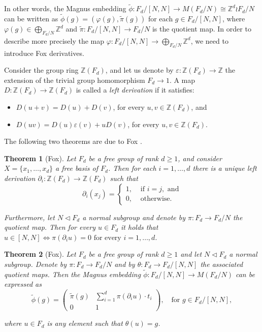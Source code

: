 \documentclass[reqno,oneside,11pt]{amsart}
\newcommand{\Z}{\mathbb{Z}}
\theoremstyle{plain}
\newtheorem{thm}{Theorem}[section] %
\theoremstyle{definition}
\begin{document}
In other words, the Magnus embedding $\widetilde{\phi}:F_d/[N,N]\to M(F_d/N)\cong \Z^d\wr F_d/N$ can be written as $\widetilde{\phi}(g)=(\varphi(g),\widetilde{\pi}(g))$ for each $g\in F_d/[N,N]$, where $\varphi(g)\in \bigoplus_{F_d/N}\Z^d$ and $\widetilde{\pi}:F_d/[N,N]\to F_d/N$ is the quotient map. In order to describe more precisely the map $\varphi:F_d/[N,N]\to \bigoplus_{F_d/N}\Z^d$, we need to introduce Fox derivatives.

Consider the group ring $\Z(F_d)$, and let us denote by $\varepsilon:\Z(F_d)\to \Z$ the extension of the trivial group homomorphism $F_d\to 1$. A map $D:\Z(F_d)\to \Z(F_d)$ is called a \emph{left derivation} if it satisfies:
\begin{itemize}
	\item $D(u+v)=D(u)+D(v)$, for every $u,v\in \Z(F_d)$, and
	\item $D(uv)=D(u)\varepsilon(v)+uD(v)$, for every $u,v\in \Z(F_d)$.
\end{itemize}


The following two theorems are due to Fox \cite{FoxI,FoxII,FoxIII,FoxIV,FoxV}.
\begin{thm}[Fox] Let $F_d$ be a free group of rank $d\ge 1$, and consider $X=\{x_1,\ldots,x_d\}$ a free basis of $F_d$. Then for each $i=1,\ldots,d$ there is a unique left derivation $\partial_i:\Z(F_d)\to \Z(F_d)$ such that 
	\[\partial_i(x_j)=\begin{cases}1, &\text{ if }i=j, \text{ and}\\ 0, &\text{ otherwise.}
	\end{cases}\]

 Furthermore, let $N\lhd F_d$ a normal subgroup and denote by $\pi:F_d\to F_d/N$ the quotient map. Then for every $u\in F_d$ it holds that  $u\in [N,N] \Longleftrightarrow \pi(\partial_i u) = 0 \text{ for every }i=1,\ldots,d.$

\end{thm}

\begin{thm}[Fox]\label{thm: FOX formulation Magnus embedding}  Let $F_d$ be a free group of rank $d\ge 1$ and let $N\lhd F_d$ a normal subgroup. Denote by $\pi:F_d\to F_d/N$ and by $\theta: F_d\to F_d/[N,N]$ the associated quotient maps. Then the Magnus embedding $\widetilde{\phi}:F_d/[N,N]\to M(F_d/N)$ can be expressed as 
	\begin{equation*}
		\widetilde{\phi}(g)=\begin{pmatrix}
			\widetilde{\pi}(g) & \sum_{i=1}^d \pi(\partial_i u)\cdot t_i\\ 0 & 1
		\end{pmatrix}, \ \ \ \text{ for }g\in F_d/[N,N],
	\end{equation*}
	
	where $u\in F_d$ is any element such that $\theta(u)=g$.
\end{thm}
\end{document}
